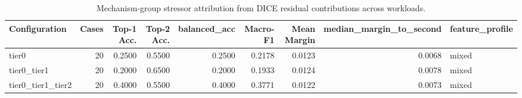 \begin{table}[t]
\centering
\caption{Mechanism-group stressor attribution from DICE residual contributions across workloads.}
\label{tab:dice_stressor_diagnosis}
\footnotesize
\begin{tabular}{lrrrrrrrl}
\toprule
Configuration & Cases & Top-1 Acc. & Top-2 Acc. & balanced_acc & Macro-F1 & Mean Margin & median_margin_to_second & feature_profile \\
\midrule
tier0 & 20 & 0.2500 & 0.5500 & 0.2500 & 0.2178 & 0.0123 & 0.0068 & mixed \\
tier0_tier1 & 20 & 0.2000 & 0.6500 & 0.2000 & 0.1933 & 0.0124 & 0.0078 & mixed \\
tier0_tier1_tier2 & 20 & 0.4000 & 0.5500 & 0.4000 & 0.3771 & 0.0122 & 0.0073 & mixed \\
\bottomrule
\end{tabular}

\end{table}
